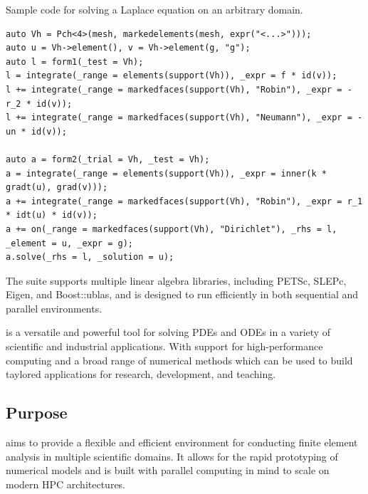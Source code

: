 \begin{listing}[ht]
        \caption{Sample \Feelpp code for solving a Laplace equation on an arbitrary domain.}
\begin{verbatim}
auto Vh = Pch<4>(mesh, markedelements(mesh, expr("<...>")));
auto u = Vh->element(), v = Vh->element(g, "g");
auto l = form1(_test = Vh);
l = integrate(_range = elements(support(Vh)), _expr = f * id(v));
l += integrate(_range = markedfaces(support(Vh), "Robin"), _expr = -r_2 * id(v));
l += integrate(_range = markedfaces(support(Vh), "Neumann"), _expr = -un * id(v));

auto a = form2(_trial = Vh, _test = Vh);
a = integrate(_range = elements(support(Vh)), _expr = inner(k * gradt(u), grad(v)));
a += integrate(_range = markedfaces(support(Vh), "Robin"), _expr = r_1 * idt(u) * id(v));
a += on(_range = markedfaces(support(Vh), "Dirichlet"), _rhs = l, _element = u, _expr = g);
a.solve(_rhs = l, _solution = u);
\end{verbatim}
\end{listing}

The suite supports multiple linear algebra libraries, including PETSc, SLEPc, Eigen, and Boost::ublas, and is designed to run efficiently in both sequential and parallel environments.



\Feelpp is a versatile and powerful tool for solving PDEs and ODEs in a variety of scientific and industrial applications.
With support for high-performance computing and a broad range of numerical methods which can be used to build taylored applications for research, development, and teaching.


\subsection{Purpose}
\label{sec:Feelpp:purpose}
\Feelpp aims to provide a flexible and efficient environment for conducting finite element analysis in multiple scientific domains.
It allows for the rapid prototyping of numerical models and is built with parallel computing in mind to scale on modern HPC architectures.

